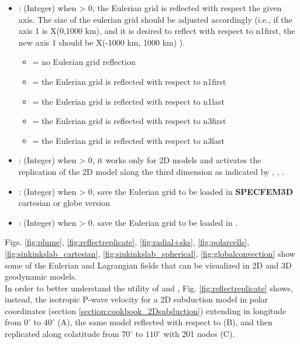 \begin{itemize}
	\item {}: (Integer) when > 0, the Eulerian grid is reflected with respect the given axis. The size of the eulerian grid should be adjusted accordingly (i.e., if the \drexmtitle{} axis 1 is X(0,1000 km), and it is desired to reflect with respect to n1first, the new axis 1 should be X(-1000 km, 1000 km) ).

    \begin{itemize}
        \item[]  = no Eulerian grid reflection
        \item[]  = the Eulerian grid is reflected with respect to n1first
        \item[]  = the Eulerian grid is reflected with respect to n1last
        \item[]  = the Eulerian grid is reflected with respect to n3first
        \item[]  = the Eulerian grid is reflected with respect to n3last
    \end{itemize}

	\item {}: (Integer) when > 0, it works only for 2D models and activates the replication of the 2D model along the third dimension as indicated by , , .

	\item {}: (Integer) when > 0, save the Eulerian grid to be loaded in \textbf{SPECFEM3D} cartesian or globe version

    \item {}: (Integer) when > 0, save the Eulerian grid to be loaded in \psitomotitle{}.

\end{itemize}

\vspace{0.5cm}

Figs. \ref{fig:plume}, \ref{fig:reflectreplicate}, \ref{fig:radial+sks}, \ref{fig:polarcells}, \ref{fig:sinkinkslab_cartesian}, \ref{fig:sinkinkslab_spherical}, \ref{fig:globalconvection} show some of the Eulerian and Lagrangian fields that can be visualized in 2D and 3D geodynamic models.\\

In order to better understand the utility of  and , Fig. \ref{fig:reflectreplicate} shows, instead, the isotropic P-wave velocity for a 2D subduction model in polar coordinates (section \ref{section:cookbook_2Dsubduction}) extending in longitude from $0^{\circ}$ to $40^{\circ}$ (A), the same model reflected with respect to  (B), and then replicated along colatitude from $70^{\circ}$ to $110^{\circ}$ with 201 nodes (C).\\


